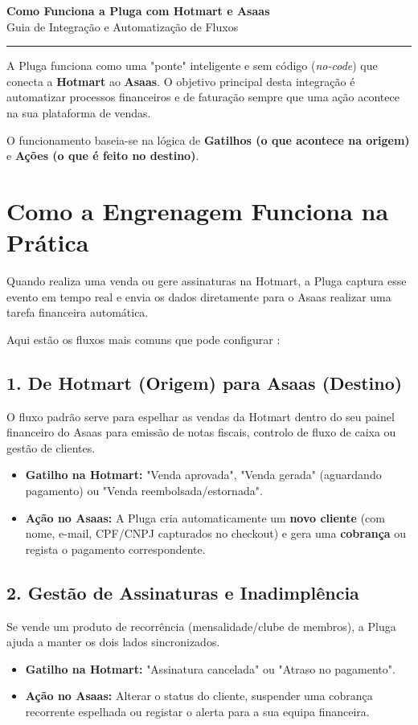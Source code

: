 \documentclass[11pt,a4paper]{article}
\begin{document}
\begin{center}
    {\LARGE\bfseries\color{primary} Como Funciona a Pluga com Hotmart e Asaas} \\[0.3cm]
    {\large Guia de Integração e Automatização de Fluxos} \\[0.5cm]
    \rule{\linewidth}{0.5mm}
\end{center}

A Pluga funciona como uma "ponte" inteligente e sem código (\textit{no-code}) que conecta a \textbf{Hotmart} ao \textbf{Asaas}. O objetivo principal desta integração é automatizar processos financeiros e de faturação sempre que uma ação acontece na sua plataforma de vendas.

O funcionamento baseia-se na lógica de \textbf{Gatilhos (o que acontece na origem)} e \textbf{Ações (o que é feito no destino)}.

\section{Como a Engrenagem Funciona na Prática}
Quando realiza uma venda ou gere assinaturas na Hotmart, a Pluga captura esse evento em tempo real e envia os dados diretamente para o Asaas realizar uma tarefa financeira automática.

Aqui estão os fluxos mais comuns que pode configurar :

\subsection{1. De Hotmart (Origem) para Asaas (Destino)}
O fluxo padrão serve para espelhar as vendas da Hotmart dentro do seu painel financeiro do Asaas para emissão de notas fiscais, controlo de fluxo de caixa ou gestão de clientes.
\begin{itemize}[label=\textbullet, leftmargin=*]
    \item \textbf{Gatilho na Hotmart:} "Venda aprovada", "Venda gerada" (aguardando pagamento) ou "Venda reembolsada/estornada".
    \item \textbf{Ação no Asaas:} A Pluga cria automaticamente um \textbf{novo cliente} (com nome, e-mail, CPF/CNPJ capturados no checkout) e gera uma \textbf{cobrança} ou regista o pagamento correspondente.
\end{itemize}

\subsection{2. Gestão de Assinaturas e Inadimplência}
Se vende um produto de recorrência (mensalidade/clube de membros), a Pluga ajuda a manter os dois lados sincronizados.
\begin{itemize}[label=\textbullet, leftmargin=*]
    \item \textbf{Gatilho na Hotmart:} "Assinatura cancelada" ou "Atraso no pagamento".
    \item \textbf{Ação no Asaas:} Alterar o status do cliente, suspender uma cobrança recorrente espelhada ou registar o alerta para a sua equipa financeira.
\end{itemize}
\end{document}
